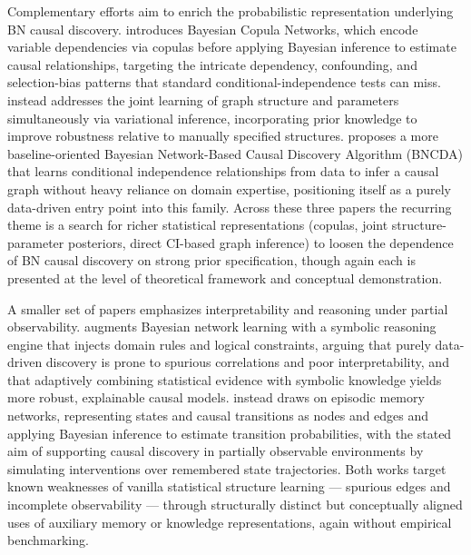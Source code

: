 Complementary efforts aim to enrich the probabilistic representation underlying BN causal discovery. \cite{zhang2026causalj} introduces Bayesian Copula Networks, which encode variable dependencies via copulas before applying Bayesian inference to estimate causal relationships, targeting the intricate dependency, confounding, and selection-bias patterns that standard conditional-independence tests can miss. \cite{zhang2026causalp} instead addresses the joint learning of graph structure and parameters simultaneously via variational inference, incorporating prior knowledge to improve robustness relative to manually specified structures. \cite{zhang2026bayesianb} proposes a more baseline-oriented Bayesian Network-Based Causal Discovery Algorithm (BNCDA) that learns conditional independence relationships from data to infer a causal graph without heavy reliance on domain expertise, positioning itself as a purely data-driven entry point into this family. Across these three papers the recurring theme is a search for richer statistical representations (copulas, joint structure-parameter posteriors, direct CI-based graph inference) to loosen the dependence of BN causal discovery on strong prior specification, though again each is presented at the level of theoretical framework and conceptual demonstration.

A smaller set of papers emphasizes interpretability and reasoning under partial observability. \cite{zhang2026adaptive} augments Bayesian network learning with a symbolic reasoning engine that injects domain rules and logical constraints, arguing that purely data-driven discovery is prone to spurious correlations and poor interpretability, and that adaptively combining statistical evidence with symbolic knowledge yields more robust, explainable causal models. \cite{zhang2026causalq} instead draws on episodic memory networks, representing states and causal transitions as nodes and edges and applying Bayesian inference to estimate transition probabilities, with the stated aim of supporting causal discovery in partially observable environments by simulating interventions over remembered state trajectories. Both works target known weaknesses of vanilla statistical structure learning --- spurious edges and incomplete observability --- through structurally distinct but conceptually aligned uses of auxiliary memory or knowledge representations, again without empirical benchmarking.

